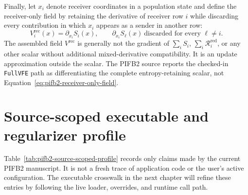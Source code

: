Finally, let \(x_i\) denote receiver coordinates in a population state and define the receiver-only field by retaining the derivative of receiver row \(i\) while discarding every contribution in which \(x_i\) appears as a sender in another row:
\begin{equation}
V_i^{\mathrm{rec}}(x)
=\partial_{x_i}S_i(x),
\qquad
\partial_{x_i}S_\ell(x)\ \text{discarded for every \(\ell\neq i\)}.
\label{eq:pifb2-receiver-only-field}
\end{equation}
The assembled field \(V^{\mathrm{rec}}\) is generally not the gradient of \(\sum_iS_i\), \(\sum_i\mathcal R_i^{\mathrm{red}}\), or any other scalar without additional mixed-derivative compatibility. It is an update approximation outside the scalar. The PIFB2 source reports the checked-in \texttt{FullVFE} path as differentiating the complete entropy-retaining scalar, not Equation~\eqref{eq:pifb2-receiver-only-field}.

\section{Source-scoped executable and regularizer profile}

Table~\ref{tab:pifb2-source-scoped-profile} records only claims made by the current PIFB2 manuscript. It is not a fresh trace of application code or the user's active configuration. The executable crosswalk in the next chapter will refine these entries by following the live loader, overrides, and runtime call path.

